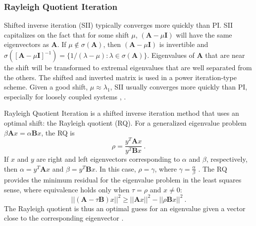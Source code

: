 \documentclass[preprint,12pt]{elsarticle}
\newcommand{\ve}[1]{\ensuremath{\mathbf{#1}}}
\begin{document}
\subsubsection{Rayleigh Quotient Iteration}
Shifted inverse iteration (SII) typically converges more quickly than PI. SII capitalizes on the fact that for some shift $\mu$, $(\ve{A} - \mu \ve{I})$ will have the same eigenvectors as $\ve{A}$. If $\mu \notin \sigma(\ve{A})$, then $(\ve{A} - \mu \ve{I})$ is invertible and $\sigma([\ve{A} - \mu \ve{I}]^{-1}) = \{1/(\lambda - \mu):\lambda \in \sigma(\ve{A})\}$. Eigenvalues of $\ve{A}$ that are near the shift will be transformed to extremal eigenvalues that are well separated from the others. The shifted and inverted matrix is used in a power iteration-type scheme. Given a good shift, $\mu \approx \lambda_1$, SII usually converges more quickly than PI, especially for loosely coupled systems \cite{Trefethen1997}, \cite{Allen2002}.


Rayleigh Quotient Iteration is a shifted inverse iteration method %
that uses an optimal shift: the Rayleigh quotient (RQ). For a generalized eigenvalue problem $\beta \ve{A}x = \alpha \ve{B}x$, the RQ is
%
\begin{equation}
  \rho = \frac{y^{T} \ve{A} x}{y^{T} \ve{B} x} \:.
  \label{eq:RQ}
\end{equation}
%
If $x$ and $y$ are right and left eigenvectors corresponding to $\alpha$ and $\beta$, respectively, then $\alpha = y^{T} \ve{A} x$ and $\beta =  y^{T} \ve{B} x$. In this case, $\rho = \gamma$, where $\gamma = \frac{\alpha}{\beta}$ \cite{Stewart2001}. The RQ provides the minimum residual for the eigenvalue problem in the least squares sense, where equivalence holds only when $\tau = \rho$ and $x \ne 0$:
%
\begin{equation}
  ||(\ve{A} - \tau\ve{B})x||^{2} \ge ||\ve{A}x||^{2} - ||\rho\ve{B}x||^{2} \:.
\end{equation}
%
The Rayleigh quotient is thus an optimal guess for an eigenvalue given a vector close to the corresponding eigenvector \cite{Parlett1974}. 
\end{document}
